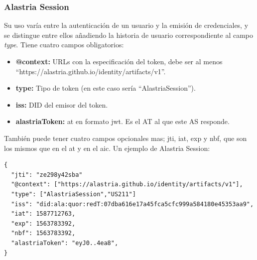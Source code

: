 \subsubsection*{Alastria Session}
Su uso varía entre la autenticación de un usuario y la emisión de credenciales, y se distingue entre ellos añadiendo la historia de usuario correspondiente al campo \textit{type}.
Tiene cuatro campos obligatorios:
\begin{itemize}
    \item \textbf{@context:} URLs con la especificación del token, debe ser al menos\\ ``https://alastria.github.io/identity/artifacts/v1''.
    \item \textbf{type:} Tipo de token (en este caso sería ``AlastriaSession'').
    \item \textbf{iss:} DID del emisor del token. 
    \item \textbf{alastriaToken:} \acrshort{at} en formato \acrshort{jwt}. Es el AT al que este AS responde.
\end{itemize}
También puede tener cuatro campos opcionales mas; jti, iat, exp y nbf, que son los mismos que en el \acrshort{at} y en el \acrshort{aic}.
Un ejemplo de Alastria Session:
\begin{verbatim}
{
  "jti": "ze298y42sba"  
  "@context": ["https://alastria.github.io/identity/artifacts/v1"],
  "type": ["AlastriaSession","US211"]
  "iss": "did:ala:quor:redT:07dba616e17a45fca5cfc999a584180e45353aa9",
  "iat": 1587712763,
  "exp": 1563783392,
  "nbf": 1563783392,
  "alastriaToken": "eyJ0..4ea8",
}
\end{verbatim}
